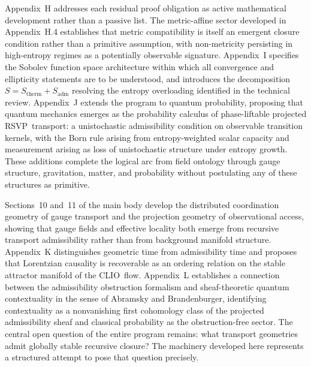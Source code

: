 \documentclass[12pt,a4paper]{article}
\newcommand{\RSVP}{\textrm{RSVP}}
\newcommand{\CLIO}{\textrm{CLIO}}
\begin{document}
Appendix~H addresses each residual proof obligation as active mathematical
development rather than a passive list. The metric-affine sector developed
in Appendix~H.4 establishes that metric compatibility is itself an emergent
closure condition rather than a primitive assumption, with non-metricity
persisting in high-entropy regimes as a potentially observable signature.
Appendix~I specifies the Sobolev function space architecture within which
all convergence and ellipticity statements are to be understood, and
introduces the decomposition $S=S_\mathrm{therm}+S_\mathrm{adm}$ resolving
the entropy overloading identified in the technical review. Appendix~J
extends the program to quantum probability, proposing that quantum mechanics
emerges as the probability calculus of phase-liftable projected \RSVP\
transport: a unistochastic admissibility condition on observable transition
kernels, with the Born rule arising from entropy-weighted scalar capacity
and measurement arising as loss of unistochastic structure under entropy
growth. These additions complete the logical arc from field ontology through
gauge structure, gravitation, matter, and probability without postulating
any of these structures as primitive.

Sections~10 and~11 of the main body develop the distributed coordination
geometry of gauge transport and the projection geometry of observational
access, showing that gauge fields and effective locality both emerge from
recursive transport admissibility rather than from background manifold
structure. Appendix~K distinguishes geometric time from admissibility time
and proposes that Lorentzian causality is recoverable as an ordering relation
on the stable attractor manifold of the \CLIO\ flow. Appendix~L establishes
a connection between the admissibility obstruction formalism and sheaf-theoretic
quantum contextuality in the sense of Abramsky and Brandenburger, identifying
contextuality as a nonvanishing first cohomology class of the projected
admissibility sheaf and classical probability as the obstruction-free sector.
The central open question of the entire program remains: what transport
geometries admit globally stable recursive closure? The machinery developed
here represents a structured attempt to pose that question precisely.

\newpage

\appendix
\renewcommand{\thesection}{\Alph{section}}
\setcounter{section}{0}
\end{document}
